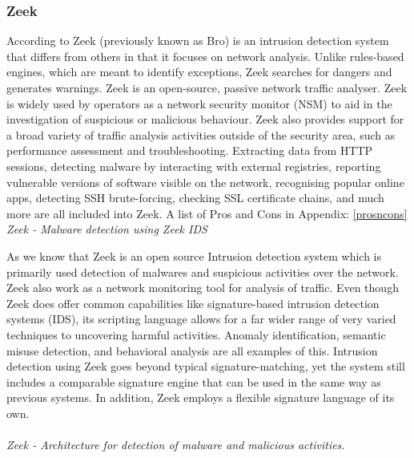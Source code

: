 \subsubsection{Zeek}

According to \cite{strand_2022} Zeek (previously known as Bro) is an intrusion detection system that differs from others in that it focuses on network analysis. Unlike rules-based engines, which are meant to identify exceptions, Zeek searches for dangers and generates warnings. Zeek is an open-source, passive network traffic analyser. Zeek is widely used by operators as a network security monitor (NSM) \cite{electronics11050679} to aid in the investigation of suspicious or malicious behaviour. Zeek also provides support for a broad variety of traffic analysis activities outside of the security area, such as performance assessment and troubleshooting.
Extracting data from HTTP sessions, detecting malware by interacting with external registries, reporting vulnerable versions of software visible on the network, recognising popular online apps, detecting SSH brute-forcing, checking SSL certificate chains, and much more are all included into Zeek. A list of Pros and Cons in Appendix: \ref{prosncons}\\

\textit{Zeek - Malware detection using Zeek IDS}

As we know that Zeek is an open source Intrusion detection system which is primarily used detection of malwares and suspicious activities over the network. Zeek also work as a network monitoring tool for analysis of traffic. Even though Zeek does offer common capabilities like signature-based intrusion detection systems (IDS), its scripting language allows for a far wider range of very varied techniques to uncovering harmful activities. Anomaly identification, semantic misuse detection, and behavioral analysis are all examples of this. Intrusion detection using Zeek goes beyond typical signature-matching, yet the system still includes a comparable signature engine that can be used in the same way as previous systems. In addition, Zeek employs a flexible signature language of its own.\\
\\
\textit{Zeek - Architecture for detection of malware and malicious activities.}


